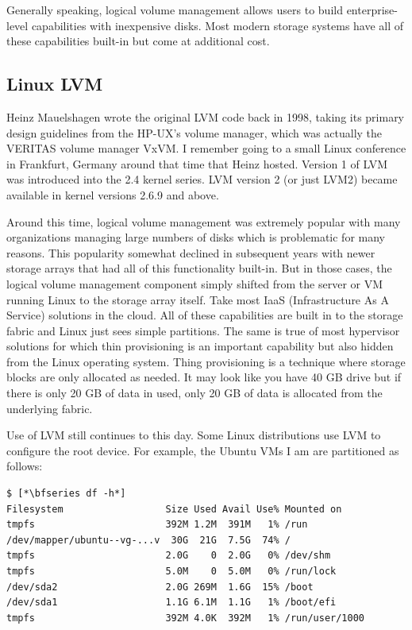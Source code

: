 \noindent 
Generally speaking, logical volume management allows users to build enterprise-level capabilities with inexpensive disks. Most modern storage systems have all of these capabilities built-in but come at additional cost.


\subsection{Linux LVM}

Heinz Mauelshagen wrote the original LVM code back in 1998, taking its primary design guidelines from the HP-UX's volume manager, which was actually the VERITAS volume manager VxVM. I remember going to a small Linux conference in Frankfurt, Germany around that time that Heinz hosted. Version 1 of LVM was introduced into the 2.4 kernel series. LVM version 2 (or just LVM2) became available in kernel versions 2.6.9 and above.

Around this time, logical volume management was extremely popular with many organizations managing large numbers of disks which is problematic for many reasons. This popularity somewhat declined in subsequent years with newer storage arrays that had all of this functionality built-in. But in those cases, the logical volume management component simply shifted from the server or VM running Linux to the storage array itself. Take most IaaS (Infrastructure As A Service) solutions in the cloud. All of these capabilities are built in to the storage fabric and Linux just sees simple partitions. The same is true of most hypervisor solutions for which thin provisioning is an important capability but also hidden from the Linux operating system. Thing provisioning is a technique where storage blocks are only allocated as needed. It may look like you have 40 GB drive but if there is only 20 GB of data in used, only 20 GB of data is allocated from the underlying fabric.

Use of LVM still continues to this day. Some Linux distributions use LVM to configure the root device. For example, the Ubuntu VMs I am are partitioned as follows:

\begin{lstlisting}
$ [*\bfseries df -h*]
Filesystem                  Size Used Avail Use% Mounted on
tmpfs                       392M 1.2M  391M   1% /run
/dev/mapper/ubuntu--vg-...v  30G  21G  7.5G  74% /
tmpfs                       2.0G    0  2.0G   0% /dev/shm
tmpfs                       5.0M    0  5.0M   0% /run/lock
/dev/sda2                   2.0G 269M  1.6G  15% /boot
/dev/sda1                   1.1G 6.1M  1.1G   1% /boot/efi
tmpfs                       392M 4.0K  392M   1% /run/user/1000
\end{lstlisting}

